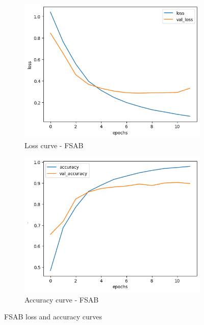 \documentclass[11pt]{article}
\begin{document}
\begin{figure}[h]
	\centering
	\begin{subfigure}{.45\textwidth}
		\centering
			\includegraphics[width = \linewidth]{graphics/FSAB_loss.png}
		\caption{Loss curve - FSAB}
		\label{fig_FSAB_loss}
	\end{subfigure}
	\begin{subfigure}{.45\textwidth}
		\centering
	\includegraphics[width = \linewidth]{graphics/FSAB_accuracy.png}
	\caption{Accuracy curve - FSAB}
	\label{fig_FSAB_accuracy}
\end{subfigure}
\caption{FSAB loss and accuracy curves}
\label{fig_FSAB_history}
\end{figure}
\end{document}

